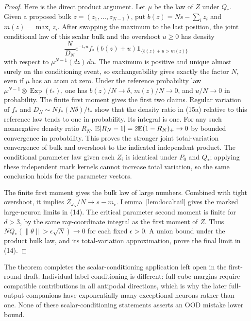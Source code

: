 \begin{proof}
Here is the direct product argument. Let $\mu$ be the law of $Z$
under $Q_*$. Given a proposed bulk $z=(z_1,\ldots,z_{N-1})$, put
$b(z)=Ns-\sum_i z_i$ and $m(z)=\max_i z_i$.
After swapping the maximum to the last position, the joint conditional
law of this scalar bulk and the overshoot $u\ge0$ has density
\[
 \frac{N}{D_N}e^{-t_*u}f_*(b(z)+u)
                  \mathbf1_{\{b(z)+u>m(z)\}}             \tag{15a}
\]
with respect to $\mu^{N-1}(dz)\,du$. The maximum is positive and
unique almost surely on the conditioning event, so exchangeability
gives exactly the factor $N$, even if $\mu$ has an atom at zero.
Under the reference probability law
$\mu^{N-1}\otimes\operatorname{Exp}(t_*)$, one has
$b(z)/N\to\delta$, $m(z)/N\to0$, and $u/N\to0$ in probability.
The finite first moment gives the first two claims. Regular variation
of $f_*$ and $D_N\sim Nf_*(N\delta)/t_*$ show that the density ratio
in (15a) relative to this reference law tends to one in probability.
Its integral is one. For any such nonnegative density ratio $R_N$,
$\mathbb E|R_N-1|=2\mathbb E(1-R_N)_+\to0$ by bounded convergence in probability.
This proves the stronger joint total-variation convergence of bulk and
overshoot to the indicated independent product.
The conditional parameter law given each $Z_i$ is identical under
$P_0$ and $Q_*$; applying these independent mark kernels cannot increase
total variation, so the same conclusion holds for the parameter vectors.

The finite first moment gives the bulk law of large numbers. Combined
with tight overshoot, it implies $Z_{J_N}/N\to s-m_c$.
Lemma~\ref{lem:localtail} gives the marked large-neuron limits in (14).
The critical parameter second moment is finite for $d>3$, by the same
ray-coordinate integral as the first moment of $Z$. Thus
$NQ_*(\|\theta\|>\epsilon\sqrt N)\to0$ for each fixed $\epsilon>0$.
A union bound under the product bulk law, and its total-variation
approximation, prove the final limit in (14).
\end{proof}

The theorem completes the scalar-conditioning application left open in
the first-round draft. Individual-label conditioning is different: full
cube margins require compatible contributions in all antipodal directions,
which is why the later full-output companions have exponentially many
exceptional neurons rather than one. None of these scalar-conditioning
statements asserts an OOD mistake lower bound.

